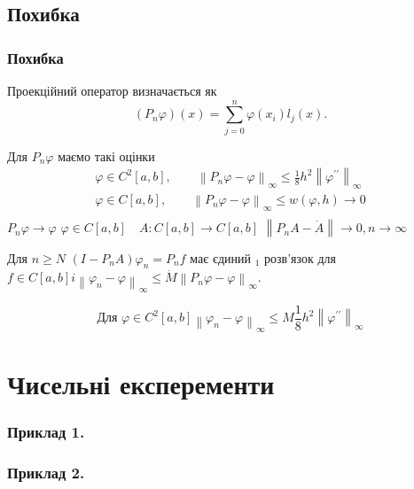\documentclass{beamer}
\numberwithin{equation}{section}
\begin{document}
	
	\subsection{Похибка}	
	\begin{frame}
		\frametitle{Похибка}
		
		Проекційний оператор визначається як 
		$$
		\left(P_{n} \varphi\right)(x)= \sum_{j=0}^{n} \varphi\left(x_{i}\right) l_{j}(x) .
		$$
		
		Для $P_{n} \varphi$ маємо такі оцінки 
		$$
		\begin{array}{l}
			\displaystyle
			\varphi \in C^{2}[a, b], \quad \quad \left\|P_{n} \varphi-\varphi\right\|_{\infty} \leq \frac{1}{8} h^{2}\left\|\varphi^{\prime \prime}\right\|_{\infty}  
			\\[0.3cm]
			
			\displaystyle
			\varphi \in C[a, b], \quad \quad \left\|P_{n} \varphi-\varphi\right\|_{\infty} \leq w(\varphi, h) \rightarrow 0
			\\[0.3cm]	
		\end{array}
		$$
		$P_{n} \varphi \rightarrow \varphi$ $\varphi \in C[a, b] \quad A: C[a, b] \rightarrow C[a, b]$  $\left\|P_{n} A-\dot{A}\right\| \rightarrow 0, n \rightarrow \infty$ 
		
		Для $n \geq N$ $\left(I-P_{n} A\right) \varphi_{n}=P_{n} f$ має єдиний $_{1}$ розв'язок для $f \in C[a, b] i\left\|\varphi_{n}-\varphi\right\|_{\infty} \leq \dot{M}\left\|P_{n} \varphi-\varphi\right\|_{\infty}$. 
		
		$$\text{Для } \varphi \in C^{2}[a, b]\left\|\varphi_{n}-\varphi\right\|_{\infty} \leq M \frac{1}{8} h^{2}\left\|\varphi^{\prime \prime}\right\|_{\infty}$$
	
		
		
		
		
		
	\end{frame}
	

	\section{Чисельні експеременти} 

	\begin{frame}
		\frametitle{Приклад 1.}
	\end{frame}
	
	\begin{frame}
		\frametitle{Приклад 2.}
	\end{frame}
	
\end{document}

